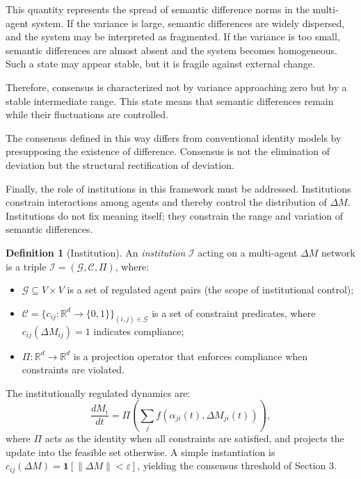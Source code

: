 \documentclass[11pt,a4paper]{article}
\theoremstyle{definition}
\newtheorem{definition}{Definition}[section]
\begin{document}
This quantity represents the spread of semantic difference norms in the multi-agent system. If the variance is large, semantic differences are widely dispersed, and the system may be interpreted as fragmented. If the variance is too small, semantic differences are almost absent and the system becomes homogeneous. Such a state may appear stable, but it is fragile against external change.

Therefore, consensus is characterized not by variance approaching zero but by a stable intermediate range. This state means that semantic differences remain while their fluctuations are controlled.

The consensus defined in this way differs from conventional identity models by presupposing the existence of difference. Consensus is not the elimination of deviation but the structural rectification of deviation.

Finally, the role of institutions in this framework must be addressed. Institutions constrain interactions among agents and thereby control the distribution of $\Delta M$. Institutions do not fix meaning itself; they constrain the range and variation of semantic differences.

\begin{definition}[Institution]
An \textit{institution} $\mathcal{I}$ acting on a multi-agent $\Delta M$ network is a triple $\mathcal{I} = (\mathcal{G}, \mathcal{C}, \Pi)$, where:
\begin{itemize}
\item $\mathcal{G} \subseteq V \times V$ is a set of regulated agent pairs (the scope of institutional control);
\item $\mathcal{C} = \{c_{ij} : \mathbb{R}^d \to \{0, 1\}\}_{(i,j) \in \mathcal{G}}$ is a set of constraint predicates, where $c_{ij}(\Delta M_{ij}) = 1$ indicates compliance;
\item $\Pi : \mathbb{R}^d \to \mathbb{R}^d$ is a projection operator that enforces compliance when constraints are violated.
\end{itemize}

The institutionally regulated dynamics are:
\[
\frac{dM_i}{dt} = \Pi\!\left(\sum_j f(\alpha_{ji}(t), \Delta M_{ji}(t))\right),
\]
where $\Pi$ acts as the identity when all constraints are satisfied, and projects the update into the feasible set otherwise. A simple instantiation is $c_{ij}(\Delta M) = \mathbf{1}[\|\Delta M\| < \varepsilon]$, yielding the consensus threshold of Section 3.
\end{definition}
\end{document}
